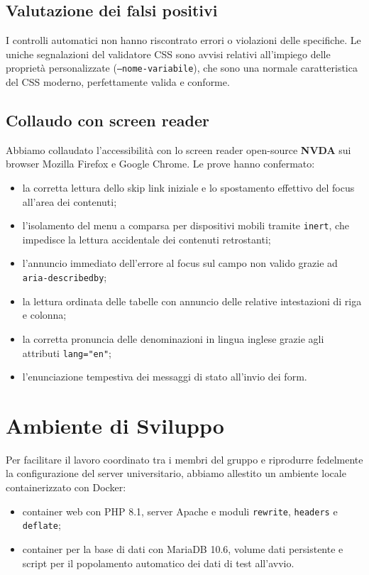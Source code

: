 \documentclass[a4paper,11pt]{article}
\begin{document}
\subsection{Valutazione dei falsi positivi}
I controlli automatici non hanno riscontrato errori o violazioni delle specifiche. Le uniche segnalazioni del validatore CSS sono avvisi relativi all'impiego delle proprietà personalizzate (\texttt{--nome-variabile}), che sono una normale caratteristica del CSS moderno, perfettamente valida e conforme.

\subsection{Collaudo con screen reader}
Abbiamo collaudato l'accessibilità con lo screen reader open-source \textbf{NVDA} sui browser Mozilla Firefox e Google Chrome. Le prove hanno confermato:
\begin{itemize}
    \item la corretta lettura dello skip link iniziale e lo spostamento effettivo del focus all'area dei contenuti;
    \item l'isolamento del menu a comparsa per dispositivi mobili tramite \texttt{inert}, che impedisce la lettura accidentale dei contenuti retrostanti;
    \item l'annuncio immediato dell'errore al focus sul campo non valido grazie ad \texttt{aria-describedby};
    \item la lettura ordinata delle tabelle con annuncio delle relative intestazioni di riga e colonna;
    \item la corretta pronuncia delle denominazioni in lingua inglese grazie agli attributi \texttt{lang="en"};
    \item l'enunciazione tempestiva dei messaggi di stato all'invio dei form.
\end{itemize}

\section{Ambiente di Sviluppo}

Per facilitare il lavoro coordinato tra i membri del gruppo e riprodurre fedelmente la configurazione del server universitario, abbiamo allestito un ambiente locale containerizzato con Docker:
\begin{itemize}
    \item container web con PHP 8.1, server Apache e moduli \texttt{rewrite}, \texttt{headers} e \texttt{deflate};
    \item container per la base di dati con MariaDB 10.6, volume dati persistente e script per il popolamento automatico dei dati di test all'avvio.
\end{itemize}
\end{document}

